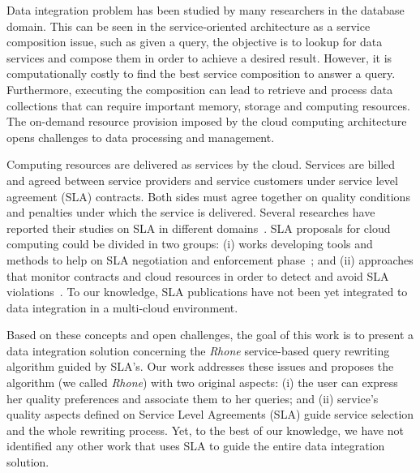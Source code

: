 Data integration problem has been studied by many researchers in the database domain.
This can be seen in the service-oriented architecture as a service composition issue, such as given a query, the objective is to lookup for data services and compose them in order to achieve a desired result. 
%
However, it is computationally costly to find the best service composition to answer a query. 
Furthermore, executing the composition can lead to retrieve and process data collections that can require important memory, storage and computing resources.
The on-demand resource provision imposed by the cloud computing architecture opens challenges to data processing and management.

Computing resources are delivered as services by the cloud. Services are billed and agreed between service providers and service customers under service level agreement (SLA) contracts.
Both sides must agree together on quality conditions and penalties under which the service is delivered. 
Several researches have reported their studies on SLA in different domains~\cite{AlhamadDC11}.
SLA proposals for cloud computing could be divided in two groups: (i) works developing tools and methods to help on SLA negotiation and enforcement phase~\cite{rak2013,Mavrogeorgi2013}; and (ii) approaches that monitor contracts and cloud resources in order to detect and avoid SLA violations~\cite{Leitner2010,Maarouf2015}. To our knowledge, SLA publications have not been yet integrated to data integration in a multi-cloud environment.

Based on these concepts and open challenges, the goal of this work is to present
a data integration solution concerning the \textit{Rhone} service-based query rewriting algorithm guided by SLA's.
Our work addresses these issues and proposes the algorithm (we
called \textit{Rhone}) with two original aspects: (i) the user can express her
quality preferences and associate them to her queries; and (ii)  service's quality aspects defined on Service Level Agreements (SLA) guide service selection and the whole rewriting process.
Yet, to the best of our knowledge, we have not identified any other work that uses SLA to guide the entire data integration solution.

